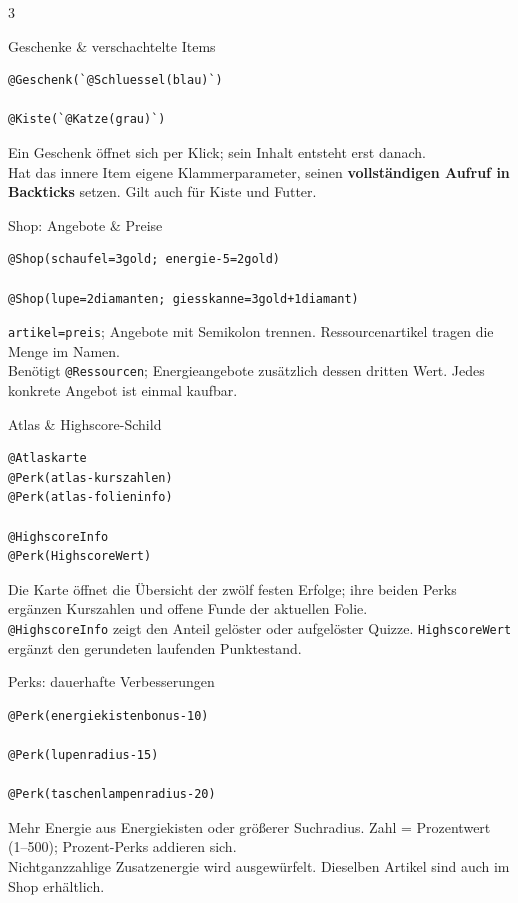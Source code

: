 \documentclass[a4paper,landscape,9pt]{extarticle}
\newcommand{\prevsm}[1]{{\footnotesize\color{muted} #1}}
\begin{document}
\begin{multicols}{3}
\begin{lootcard}{Geschenke \& verschachtelte Items}
\begin{lstlisting}[language=lia]
@Geschenk(`@Schluessel(blau)`)

@Kiste(`@Katze(grau)`)
\end{lstlisting}
\tcblower
\prevsm{Ein Geschenk öffnet sich per Klick; sein Inhalt entsteht erst danach.\\[2pt]
Hat das innere Item eigene Klammerparameter, seinen \textbf{vollständigen Aufruf in Backticks} setzen. Gilt auch für Kiste und Futter.}
\end{lootcard}

\columnbreak

\begin{lootcard}{Shop: Angebote \& Preise}
\begin{lstlisting}[language=lia]
@Shop(schaufel=3gold; energie-5=2gold)

@Shop(lupe=2diamanten; giesskanne=3gold+1diamant)
\end{lstlisting}
\tcblower
\prevsm{\texttt{artikel=preis}; Angebote mit Semikolon trennen. Ressourcenartikel tragen die Menge im Namen.\\[2pt]
Benötigt \texttt{@Ressourcen}; Energieangebote zusätzlich dessen dritten Wert. Jedes konkrete Angebot ist einmal kaufbar.}
\end{lootcard}

\begin{lootcard}{Atlas \& Highscore-Schild}
\begin{lstlisting}[language=lia]
@Atlaskarte
@Perk(atlas-kurszahlen)
@Perk(atlas-folieninfo)

@HighscoreInfo
@Perk(HighscoreWert)
\end{lstlisting}
\tcblower
\prevsm{Die Karte öffnet die Übersicht der zwölf festen Erfolge; ihre beiden Perks ergänzen Kurszahlen und offene Funde der aktuellen Folie.\\[2pt]
\texttt{@HighscoreInfo} zeigt den Anteil gelöster oder aufgelöster Quizze. \texttt{HighscoreWert} ergänzt den gerundeten laufenden Punktestand.}
\end{lootcard}

\begin{lootcard}{Perks: dauerhafte Verbesserungen}
\begin{lstlisting}[language=lia]
@Perk(energiekistenbonus-10)

@Perk(lupenradius-15)

@Perk(taschenlampenradius-20)
\end{lstlisting}
\tcblower
\prevsm{Mehr Energie aus Energiekisten oder größerer Suchradius. Zahl = Prozentwert (1--500); Prozent-Perks addieren sich.\\[2pt]
Nichtganzzahlige Zusatzenergie wird ausgewürfelt. Dieselben Artikel sind auch im Shop erhältlich.}
\end{lootcard}


\end{multicols}
\end{document}
